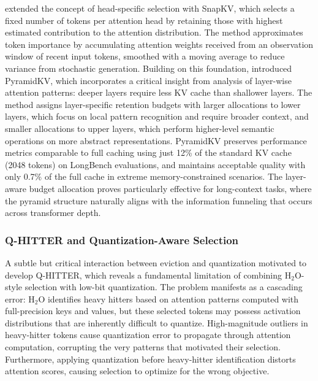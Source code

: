 \citet{li2024snapkv} extended the concept of head-specific selection with SnapKV, which selects a fixed number of tokens per attention head by retaining those with highest estimated contribution to the attention distribution. The method approximates token importance by accumulating attention weights received from an observation window of recent input tokens, smoothed with a moving average to reduce variance from stochastic generation. Building on this foundation, \citet{cai2024pyramidkv} introduced PyramidKV, which incorporates a critical insight from analysis of layer-wise attention patterns: deeper layers require less KV cache than shallower layers. The method assigns layer-specific retention budgets with larger allocations to lower layers, which focus on local pattern recognition and require broader context, and smaller allocations to upper layers, which perform higher-level semantic operations on more abstract representations. PyramidKV preserves performance metrics comparable to full caching using just 12\% of the standard KV cache (2048 tokens) on LongBench evaluations, and maintains acceptable quality with only 0.7\% of the full cache in extreme memory-constrained scenarios. The layer-aware budget allocation proves particularly effective for long-context tasks, where the pyramid structure naturally aligns with the information funneling that occurs across transformer depth.

\subsubsection{Q-HITTER and Quantization-Aware Selection}

A subtle but critical interaction between eviction and quantization motivated \citet{kang2024qhitter} to develop Q-HITTER, which reveals a fundamental limitation of combining H$_2$O-style selection with low-bit quantization. The problem manifests as a cascading error: H$_2$O identifies heavy hitters based on attention patterns computed with full-precision keys and values, but these selected tokens may possess activation distributions that are inherently difficult to quantize. High-magnitude outliers in heavy-hitter tokens cause quantization error to propagate through attention computation, corrupting the very patterns that motivated their selection. Furthermore, applying quantization before heavy-hitter identification distorts attention scores, causing selection to optimize for the wrong objective.

